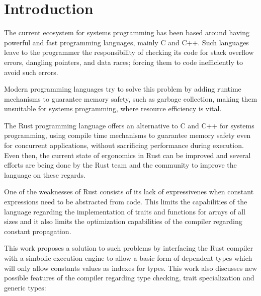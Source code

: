 \chapter{Introduction}
\label{chap:introduction}
The current ecosystem for systems programming has been based around having
powerful and fast programming languages, mainly C and C++. Such languages leave
to the programmer the responsibility of checking its code for stack overflow
errors, dangling pointers, and data races; forcing them to code inefficiently
to avoid such errors.

Modern programming languages try to solve this problem by adding runtime
mechanisms to guarantee memory safety, such as garbage collection, making them
unsuitable for systems programming, where resource efficiency is vital.

The Rust programming language offers an alternative to C and C++ for systems
programming, using compile time mechanisms to guarantee memory safety even for
concurrent applications, without sacrificing performance during execution. Even
then, the current state of ergonomics in Rust can be improved and several
efforts are being done by the Rust team and the community to improve the
language on these regards.

One of the weaknesses of Rust consists of its lack of expressivenes when
constant expressions need to be abstracted from code. This limits the
capabilities of the language regarding the implementation of traits and
functions for arrays of all sizes and it also limits the optimization
capabilities of the compiler regarding constant propagation.

This work proposes a solution to such problems by interfacing the Rust compiler
with a simbolic execution engine to allow a basic form of dependent types which
will only allow constants values as indexes for types. This work also discusses
new possible features of the compiler regarding type checking, trait
specialization and generic types:

